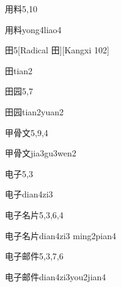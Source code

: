 \begin{entry}{用料}{5,10}
  \begin{phonetics}{用料}{yong4liao4}
  \end{phonetics}
\end{entry}

\begin{entry}{田}{5}[Radical 田][Kangxi 102]
  \begin{phonetics}{田}{tian2}
  \end{phonetics}
\end{entry}

\begin{entry}{田园}{5,7}
  \begin{phonetics}{田园}{tian2yuan2}
  \end{phonetics}
\end{entry}

\begin{entry}{甲骨文}{5,9,4}
  \begin{phonetics}{甲骨文}{jia3gu3wen2}
  \end{phonetics}
\end{entry}

\begin{entry}{电子}{5,3}
  \begin{phonetics}{电子}{dian4zi3}
  \end{phonetics}
\end{entry}

\begin{entry}{电子名片}{5,3,6,4}
  \begin{phonetics}{电子名片}{dian4zi3 ming2pian4}
  \end{phonetics}
\end{entry}

\begin{entry}{电子邮件}{5,3,7,6}
  \begin{phonetics}{电子邮件}{dian4zi3you2jian4}
  \end{phonetics}
\end{entry}

